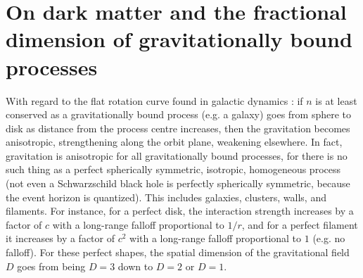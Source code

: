 \documentclass[12pt]{article}
\begin{document}
{%










\section{On dark matter and the fractional dimension of gravitationally bound processes}

With regard to the flat rotation curve found in galactic dynamics \cite{binney}: if $n$ is at least conserved as a gravitationally bound process (e.g. a galaxy) goes from sphere to disk as distance from the process centre increases, then the gravitation becomes anisotropic, strengthening along the orbit plane, weakening elsewhere.
In fact, gravitation is anisotropic for all gravitationally bound processes, for there is no such thing as a perfect spherically symmetric, isotropic, homogeneous process (not even a Schwarzschild black hole is perfectly spherically symmetric, because the event horizon is quantized).
This includes galaxies, clusters, walls, and filaments.
For instance, for a perfect disk, the interaction strength increases by a factor of $c$ with a long-range falloff proportional to $1/r$, and for a perfect filament it increases by a factor of $c^2$ with a long-range falloff proportional to $1$ (e.g. no falloff).
For these perfect shapes, the spatial dimension of the gravitational field $D$ goes from being $D = 3$ down to $D = 2$ or $D = 1$.

}
\end{document}
